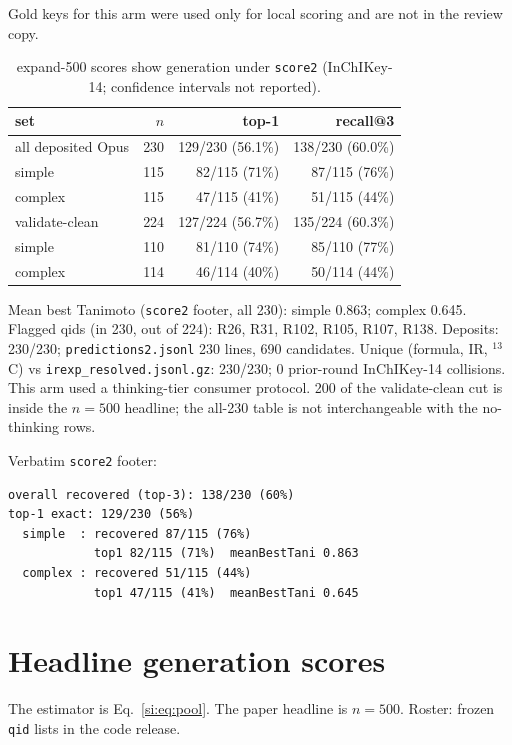 \documentclass[11pt]{article}
\begin{document}
Gold keys for this arm were used only for local scoring and are not
in the review copy.

\begin{table}[h]
\caption{expand-500 scores show generation under \texttt{score2}
(InChIKey-14; confidence intervals not reported).}
\centering
\begin{tabular}{@{}lrrr@{}}
\toprule
set & $n$ & top-1 & recall@3 \\
\midrule
all deposited Opus & 230 & 129/230 (56.1\%) & 138/230 (60.0\%) \\
\quad simple & 115 & 82/115 (71\%) & 87/115 (76\%) \\
\quad complex & 115 & 47/115 (41\%) & 51/115 (44\%) \\
validate-clean & 224 & 127/224 (56.7\%) & 135/224 (60.3\%) \\
\quad simple & 110 & 81/110 (74\%) & 85/110 (77\%) \\
\quad complex & 114 & 46/114 (40\%) & 50/114 (44\%) \\
\bottomrule
\end{tabular}
\end{table}

Mean best Tanimoto (\texttt{score2} footer, all 230): simple 0.863; complex 0.645.
Flagged qids (in 230, out of 224): R26, R31, R102, R105, R107, R138.
Deposits: 230/230; \texttt{predictions2.jsonl} 230 lines, 690 candidates.
Unique (formula, IR, $^{13}$C) vs \texttt{irexp\_resolved.jsonl.gz}: 230/230;
0 prior-round InChIKey-14 collisions.
This arm used a thinking-tier consumer protocol.
200 of the validate-clean cut is inside the $n{=}500$ headline;
the all-230 table is not interchangeable with the no-thinking rows.

Verbatim \texttt{score2} footer:
\begin{verbatim}
overall recovered (top-3): 138/230 (60%)
top-1 exact: 129/230 (56%)
  simple  : recovered 87/115 (76%)
            top1 82/115 (71%)  meanBestTani 0.863
  complex : recovered 51/115 (44%)
            top1 47/115 (41%)  meanBestTani 0.645
\end{verbatim}

\section{Headline generation scores}
\label{si:pools}

The estimator is Eq.~\ref{si:eq:pool}. The paper headline is $n{=}500$.
Roster: frozen \texttt{qid} lists in the code release.
\end{document}
